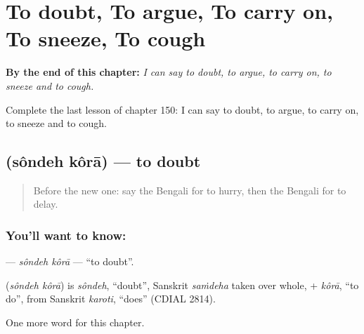 
\chapter{To doubt, To argue, To carry on, To sneeze, To cough}
\label{ch:bn-to-doubt-to-argue-to-carry-on-to-sneeze-to-cough}

\begin{chapteropening}
\textbf{By the end of this chapter:} \emph{I can say to doubt, to argue, to carry on, to sneeze and to cough.}

Complete the last lesson of chapter 150: I can say to doubt, to argue, to carry on, to sneeze and to cough.
\end{chapteropening}

\section[\texorpdfstring{\bn{সন্দেহ} \bn{করা} (sôndeh kôrā)}{সন্দেহ করা (sôndeh kôrā)}]{  (sôndeh kôrā) — to doubt}

\label{lesson:BN-C150-sondeh-kora}



\begin{quote}
Before the new one: say the Bengali for to hurry, then the Bengali for to delay.
\end{quote}

\subsection*{You'll want to know:  }
\textbf{ } — \emph{sôndeh kôrā} — \textquotedblleft{}to doubt\textquotedblright{}.

\begin{cousinweb}
\textbf{ } (\emph{sôndeh kôrā}) is \emph{sôndeh}, \textquotedblleft{}doubt\textquotedblright{}, Sanskrit \emph{saṁdeha} taken over whole, + \emph{kôrā}, \textquotedblleft{}to do\textquotedblright{}, from Sanskrit \emph{karoti}, \textquotedblleft{}does\textquotedblright{} (CDIAL 2814).
\end{cousinweb}

\begin{grammarlens}[title={What you've built}]
One more word for this chapter.
\end{grammarlens}

